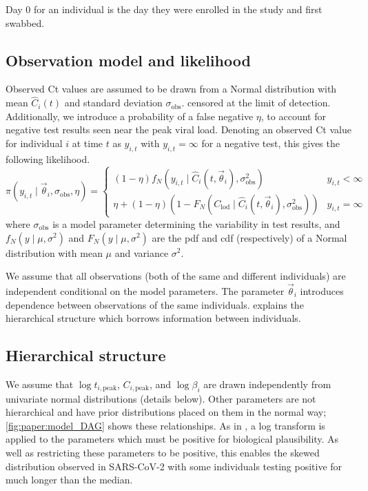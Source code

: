 \documentclass[thesis.tex]{subfiles}
\begin{document}
Day 0 for an individual is the day they were enrolled in the study and first swabbed.

\subsection{Observation model and likelihood}

Observed Ct values are assumed to be drawn from a Normal distribution with mean $\hat{C}_i(t)$ and standard deviation $\sigma_\text{obs}$.
censored at the limit of detection.
Additionally, we introduce a probability of a false negative $\eta$, to account for negative test results seen near the peak viral load.
Denoting an observed Ct value for individual $i$ at time $t$ as $y_{i,t}$ with
$y_{i,t} = \infty$ for a negative test, this gives the following likelihood.
$$
\pi(y_{i,t} \mid \vec\theta_i, \sigma_\text{obs}, \eta) = \begin{cases}
  (1 - \eta) f_N(y_{i,t} \mid \hat{C}_i(t, \vec\theta_i), \sigma_\text{obs}^2) &y_{i,t} < \infty \\
  \eta + (1 - \eta) (1 - F_N(C_\text{lod} \mid \hat{C}_i(t, \vec\theta_i), \sigma_\text{obs}^2)) & y_{i,t} = \infty
\end{cases}
$$
where $\sigma_\text{obs}$ is a model parameter determining the variability in
test results, and $f_N(y \mid \mu, \sigma^2)$ and $F_N(y \mid \mu, \sigma^2)$ are the pdf
and cdf (respectively) of a Normal distribution with mean $\mu$ and variance $\sigma^2$.

We assume that all observations (both of the same and different individuals) are independent conditional on the model parameters.
The parameter $\vec\theta_i$ introduces dependence between observations of the same individuals.
 explains the hierarchical structure which borrows information between individuals.

\subsection{Hierarchical structure}\label{sec:paper:hierarchy}

We assume that $\log t_{i,\text{peak}}$, $C_{i,\text{peak}}$, and $\log \beta_i$ are drawn independently from univariate normal distributions (details below).
Other parameters are not hierarchical and have prior distributions placed on them in the normal way; \cref{fig:paper:model_DAG} shows these relationships.
As in \textcite{fogartyBayesian}, a log transform is applied to the parameters which must be positive for biological plausibility.
As well as restricting these parameters to be positive, this enables the skewed distribution observed in SARS-CoV-2 with some individuals testing positive for much longer than the median.
\end{document}
